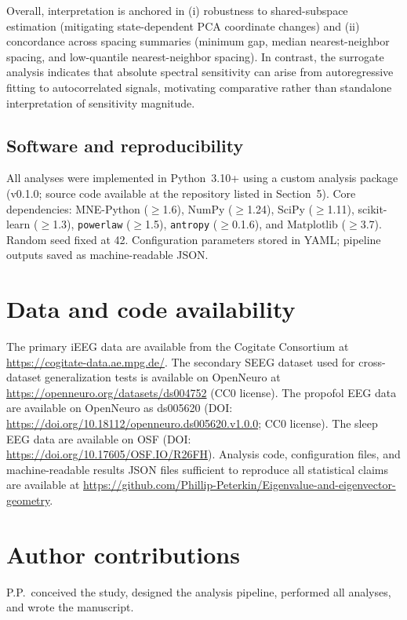 \documentclass[preprint,12pt,nonatbib]{elsarticle}
\begin{document}
Overall, interpretation is anchored in (i) robustness to shared-subspace estimation (mitigating state-dependent PCA coordinate changes) and (ii) concordance across spacing summaries (minimum gap, median nearest-neighbor spacing, and low-quantile nearest-neighbor spacing). In contrast, the surrogate analysis indicates that absolute spectral sensitivity can arise from autoregressive fitting to autocorrelated signals, motivating comparative rather than standalone interpretation of sensitivity magnitude.

\subsection{Software and reproducibility}

All analyses were implemented in Python~3.10+ using a custom analysis package (v0.1.0; source code available at the repository listed in Section~5). Core dependencies: MNE-Python ($\geq$1.6), NumPy ($\geq$1.24), SciPy ($\geq$1.11), scikit-learn ($\geq$1.3), \texttt{powerlaw} ($\geq$1.5), \texttt{antropy} ($\geq$0.1.6), and Matplotlib ($\geq$3.7). Random seed fixed at 42. Configuration parameters stored in YAML; pipeline outputs saved as machine-readable JSON.

\section{Data and code availability}
The primary iEEG data are available from the Cogitate Consortium at \url{https://cogitate-data.ae.mpg.de/}. The secondary SEEG dataset used for cross-dataset generalization tests is available on OpenNeuro at \url{https://openneuro.org/datasets/ds004752} (CC0 license). The propofol EEG data are available on OpenNeuro as ds005620 (DOI: \url{https://doi.org/10.18112/openneuro.ds005620.v1.0.0}; CC0 license). The sleep EEG data are available on OSF (DOI: \url{https://doi.org/10.17605/OSF.IO/R26FH}). Analysis code, configuration files, and machine-readable results JSON files sufficient to reproduce all statistical claims are available at \url{https://github.com/Phillip-Peterkin/Eigenvalue-and-eigenvector-geometry}.

\section{Author contributions}
P.P.\ conceived the study, designed the analysis pipeline, performed all analyses, and wrote the manuscript.
\end{document}
